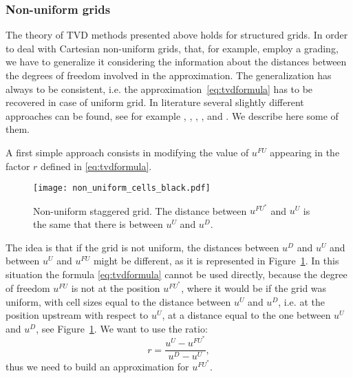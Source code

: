 \subsubsection{Non-uniform grids}
The theory of TVD methods presented above holds for structured grids. In order 
to deal with Cartesian non-uniform grids, that, for example, employ a grading, we 
have to generalize it considering the information about the distances between 
the degrees of freedom involved in the approximation. The generalization has 
always to be consistent, i.e. the approximation~\eqref{eq:tvdformula} has to be 
recovered in case of uniform grid. In literature several slightly different 
approaches can be found, see for example \cite{nonunif:bruner}, 
\cite{nonunif:darmou}, \cite{nonunif:li}, \cite{nonunif:berger}, 
\cite{nonunif:hou} and \cite{nonunif:zeng}. We describe here some of them.

A first simple approach consists in modifying the value of $u^{FU}$ appearing 
in the factor $r$ defined in \eqref{eq:tvdformula}.
\begin{figure}
	\centering
	\texttt{[image: non\_uniform\_cells\_black.pdf]}
	\caption[Non-uniform staggered grid]{Non-uniform staggered grid. The 
	distance between $u^{FU^*}$ and $u^U$ is the same that there is between 
	$u^U$ and $u^D$.}
	\label{fig:nonunifli}
\end{figure}

The idea is that if the grid is not uniform, the distances between $u^D$ and 
$u^U$ and between $u^U$ and $u^{FU}$ might be different, as it is represented 
in Figure~\ref{fig:nonunifli}. In this situation the formula 
\eqref{eq:tvdformula} cannot be used directly, because the degree of freedom 
$u^{FU}$ is not at the position 
$u^{FU^*}$, where it would be if the grid was uniform, with cell sizes equal to 
the distance between $u^U$ and $u^D$, i.e. at the position upstream with 
respect to $u^U$, at a distance equal to the one between $u^U$ and $u^D$, see 
Figure~\ref{fig:nonunifli}. We want to use the ratio:
\begin{equation*}
r = \frac{u^U - u^{FU^*}}{u^D - u^U},
\end{equation*}
thus we need to build an approximation for $u^{FU^*}$.

